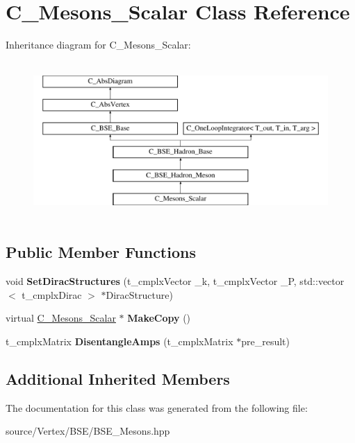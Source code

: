 \hypertarget{class_c___mesons___scalar}{\section{C\-\_\-\-Mesons\-\_\-\-Scalar Class Reference}
\label{class_c___mesons___scalar}
}
Inheritance diagram for C\-\_\-\-Mesons\-\_\-\-Scalar\-:\begin{figure}[H]
\begin{center}
\leavevmode
\includegraphics[height=6.000000cm]{class_c___mesons___scalar}
\end{center}
\end{figure}
\subsection*{Public Member Functions}
\begin{DoxyCompactItemize}
\item 
\hypertarget{class_c___mesons___scalar_a2d20b015c874ecef6d0b7f2e128c5486}{void {\bfseries Set\-Dirac\-Structures} (t\-\_\-cmplx\-Vector \-\_\-k, t\-\_\-cmplx\-Vector \-\_\-\-P, std\-::vector$<$ t\-\_\-cmplx\-Dirac $>$ $\ast$Dirac\-Structure)}\label{class_c___mesons___scalar_a2d20b015c874ecef6d0b7f2e128c5486}

\item 
\hypertarget{class_c___mesons___scalar_ab5762566b28886e84e155d85e7586f1a}{virtual \hyperlink{class_c___mesons___scalar}{C\-\_\-\-Mesons\-\_\-\-Scalar} $\ast$ {\bfseries Make\-Copy} ()}\label{class_c___mesons___scalar_ab5762566b28886e84e155d85e7586f1a}

\item 
\hypertarget{class_c___mesons___scalar_a6fc6d0154a13bb88cd52e6367ea851a3}{t\-\_\-cmplx\-Matrix {\bfseries Disentangle\-Amps} (t\-\_\-cmplx\-Matrix $\ast$pre\-\_\-result)}\label{class_c___mesons___scalar_a6fc6d0154a13bb88cd52e6367ea851a3}

\end{DoxyCompactItemize}
\subsection*{Additional Inherited Members}


The documentation for this class was generated from the following file\-:\begin{DoxyCompactItemize}
\item 
source/\-Vertex/\-B\-S\-E/B\-S\-E\-\_\-\-Mesons.\-hpp\end{DoxyCompactItemize}
